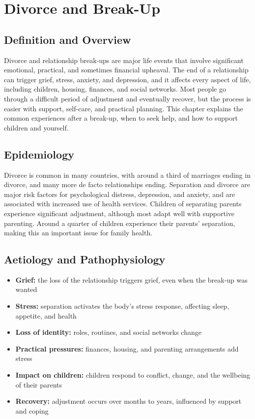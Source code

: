 \chapter{Divorce and Break-Up}

\section*{Definition and Overview}
Divorce and relationship break-ups are major life events that involve significant emotional, practical, and sometimes financial upheaval. The end of a relationship can trigger grief, stress, anxiety, and depression, and it affects every aspect of life, including children, housing, finances, and social networks. Most people go through a difficult period of adjustment and eventually recover, but the process is easier with support, self-care, and practical planning. This chapter explains the common experiences after a break-up, when to seek help, and how to support children and yourself.

\section*{Epidemiology}
Divorce is common in many countries, with around a third of marriages ending in divorce, and many more de facto relationships ending. Separation and divorce are major risk factors for psychological distress, depression, and anxiety, and are associated with increased use of health services. Children of separating parents experience significant adjustment, although most adapt well with supportive parenting. Around a quarter of children experience their parents' separation, making this an important issue for family health.

\section*{Aetiology and Pathophysiology}
\begin{itemize}
    \item \textbf{Grief:} the loss of the relationship triggers grief, even when the break-up was wanted
    \item \textbf{Stress:} separation activates the body's stress response, affecting sleep, appetite, and health
    \item \textbf{Loss of identity:} roles, routines, and social networks change
    \item \textbf{Practical pressures:} finances, housing, and parenting arrangements add stress
    \item \textbf{Impact on children:} children respond to conflict, change, and the wellbeing of their parents
    \item \textbf{Recovery:} adjustment occurs over months to years, influenced by support and coping
\end{itemize}

